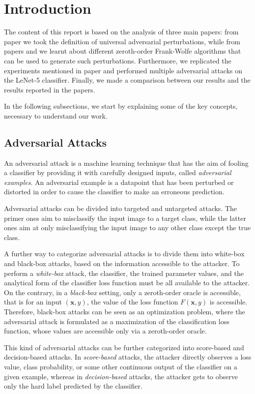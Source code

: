 \section{Introduction}
The content of this report is based on the analysis of three main papers:
from paper \cite{A2} we took the definition of universal adversarial perturbations, while from papers \cite{A3} and
\cite{A4} we learnt about different zeroth-order Frank-Wolfe algorithms that can be used to generate such perturbations.
Furthermore, we replicated the experiments mentioned in paper \cite{A3} and performed multiple adversarial attacks on the
LeNet-5 classifier. Finally, we made a comparison between our results and the results reported in the papers.

In the following subsections, we start by explaining some of the key concepts, necessary to understand our work.

\subsection{Adversarial Attacks}
An adversarial attack is a machine learning technique that has the aim of fooling a classifier by providing it with
carefully designed inputs, called \textit{adversarial examples}. An adversarial example is a datapoint that has
been perturbed or distorted in order to cause the classifier to make an erroneous prediction.

Adversarial attacks can be divided into targeted and untargeted attacks. The primer ones aim to
misclassify the input image to a target class, while the latter ones aim at only misclassifying
the input image to any other class except the true class.

A further way to categorize adversarial attacks is to divide them into white-box and black-box attacks, based on
the information accessible to the attacker. To perform a \textit{white-box} attack, the classifier, the trained
parameter values, and the analytical form of the classifier loss function must be all available to the attacker. On
the contrary, in a \textit{black-box} setting, only a zeroth-order oracle is accessible, that is for an input $(\mathbf{x},y)$,
the value of the loss function $F(\mathbf{x},y)$ is accessible. Therefore, black-box attacks can be seen as an optimization problem,
where the adversarial attack is formulated as a maximization of the classification loss function, whose values are
accessible only via a zeroth-order oracle.

This kind of adversarial attacks can be further categorized into score-based and decision-based attacks.
In \textit{score-based} attacks, the attacker directly observes a loss value, class probability, or some other
continuous output of the classifier on a given example, whereas in \textit{decision-based} attacks, the attacker gets to
observe only the hard label predicted by the classifier.


